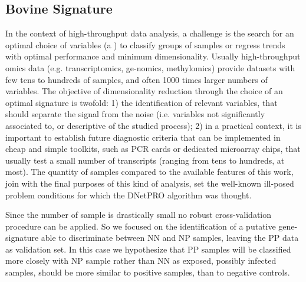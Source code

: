 \documentclass{standalone}
\begin{document}
\subsection[Results]{Bovine Signature}\label{bovine:bovine_result}

In the context of high-throughput data analysis, a challenge is the search for an optimal choice of variables (a ) to classify groups of samples or regress trends with optimal performance and minimum dimensionality.
Usually high-throughput omics data (e.g. transcriptomics, ge-nomics, methylomics) provide datasets with few tens to hundreds of samples, and often 1000 times larger numbers of variables.
The objective of dimensionality reduction through the choice of an optimal signature is twofold: 1) the identification of relevant variables, that should separate the signal from the noise (i.e. variables not significantly associated to, or descriptive of the studied process); 2) in a practical context, it is important to establish future diagnostic criteria that can be implemented in cheap and simple toolkits, such as PCR cards or dedicated microarray chips, that usually test a small number of transcripts (ranging from tens to hundreds, at most).
The quantity of samples compared to the available features of this work, join with the final purposes of this kind of analysis, set the well-known ill-posed problem conditions for which the \textsf{DNetPRO} algorithm was thought.

Since the number of sample is drastically small no robust cross-validation procedure can be applied.
So we focused on the identification of a putative gene-signature able to discriminate between NN and NP samples, leaving the PP data as validation set.
In this case we hypothesize that PP samples will be classified more closely with NP sample rather than NN as exposed, possibly infected samples, should be more similar to positive samples, than to negative controls.
\end{document}
